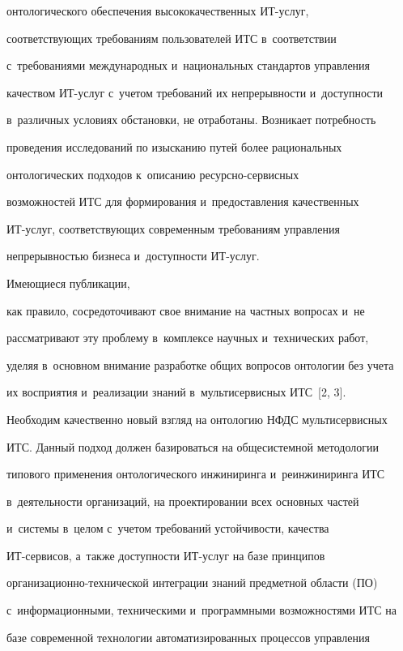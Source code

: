 онтологического обеспечения высококачественных ИТ-услуг,


соответствующих требованиям пользователей ИТС в~соответствии


с~требованиями международных и~национальных стандартов управ\-ле\-ния


качеством ИТ-услуг с~учетом требований их непрерывности и~доступности


в~различных условиях обстановки, не отработаны. Возникает потребность


проведения исследований по изысканию путей более рациональных


онтологических подходов к~описанию ре\-сурс\-но-сер\-вис\-ных


возможностей ИТС для формирования и~предоставления качественных


  ИТ-услуг, соответствующих современным требованиям управ\-ле\-ния


непрерывностью бизнеса и~доступности ИТ-услуг. 





Имеющиеся пуб\-ли\-ка\-ции,


как правило, сосредоточивают свое внимание на частных вопросах и~не


рассматривают эту проблему в~комплексе научных и~технических работ,


уделяя в~основном внимание разработке общих вопросов онтологии без учета


их восприятия и~реализации знаний в~мультисервисных ИТС~[2, 3].


Необходим качественно новый взгляд на онтологию НФДС мультисервисных


ИТС. Данный подход должен базироваться на общесистемной методологии


типового применения онтологического инжиниринга и~реинжиниринга ИТС


в~де\-я\-тель\-ности организаций, на проектировании всех основных частей


и~системы в~целом с~учетом требований устойчивости, качества


  ИТ-сер\-ви\-сов, а~так\-же до\-ступ\-ности ИТ-услуг на базе принципов


ор\-га\-ни\-за\-ци\-он\-но-тех\-ни\-че\-ской интеграции знаний предметной области (ПО)


с~информационными, техническими и~программными возможностями ИТС на


базе современной технологии автоматизированных процессов управ\-ле\-ния


